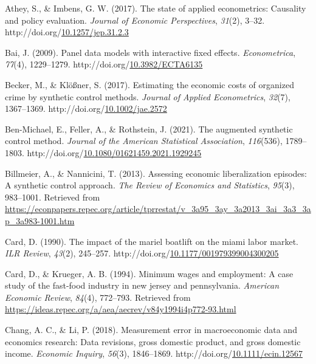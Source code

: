 \documentclass[12pt,nobind, a4paper]{reedthesis}
\newlength{\cslhangindent}
\newenvironment{CSLReferences}[2] %
{%
	\setlength{\parindent}{0pt}
	\ifodd #1 \everypar{\setlength{\hangindent}{\cslhangindent}}\ignorespaces\fi
	\ifnum #2 > 0
	\setlength{\parskip}{#2\baselineskip}
	\fi
}%
{}
\begin{document}
\begin{CSLReferences}{1}{0}
 \leavevmode{}%
 Athey, S., \& Imbens, G. W. (2017). The state of applied econometrics: Causality and policy evaluation. \emph{Journal of Economic Perspectives}, \emph{31}(2), 3--32. http://doi.org/\href{https://doi.org/10.1257/jep.31.2.3}{10.1257/jep.31.2.3}

 \leavevmode{}%
 Bai, J. (2009). Panel data models with interactive fixed effects. \emph{Econometrica}, \emph{77}(4), 1229--1279. http://doi.org/\href{https://doi.org/10.3982/ECTA6135}{10.3982/ECTA6135}

 \leavevmode{}%
 Becker, M., \& Klößner, S. (2017). Estimating the economic costs of organized crime by synthetic control methods. \emph{Journal of Applied Econometrics}, \emph{32}(7), 1367--1369. http://doi.org/\href{https://doi.org/10.1002/jae.2572}{10.1002/jae.2572}

 \leavevmode{}%
 Ben-Michael, E., Feller, A., \& Rothstein, J. (2021). The augmented synthetic control method. \emph{Journal of the American Statistical Association}, \emph{116}(536), 1789--1803. http://doi.org/\href{https://doi.org/10.1080/01621459.2021.1929245}{10.1080/01621459.2021.1929245}

 \leavevmode{}%
 Billmeier, A., \& Nannicini, T. (2013). Assessing economic liberalization episodes: A synthetic control approach. \emph{The Review of Economics and Statistics}, \emph{95}(3), 983--1001. Retrieved from \url{https://econpapers.repec.org/article/tprrestat/v_3a95_3ay_3a2013_3ai_3a3_3ap_3a983-1001.htm}

 \leavevmode{}%
 Card, D. (1990). The impact of the mariel boatlift on the miami labor market. \emph{{ILR} Review}, \emph{43}(2), 245--257. http://doi.org/\href{https://doi.org/10.1177/001979399004300205}{10.1177/001979399004300205}

 \leavevmode{}%
 Card, D., \& Krueger, A. B. (1994). Minimum wages and employment: A case study of the fast-food industry in new jersey and pennsylvania. \emph{American Economic Review}, \emph{84}(4), 772--793. Retrieved from \url{https://ideas.repec.org/a/aea/aecrev/v84y1994i4p772-93.html}

 \leavevmode{}%
 Chang, A. C., \& Li, P. (2018). Measurement error in macroeconomic data and economics research: Data revisions, gross domestic product, and gross domestic income. \emph{Economic Inquiry}, \emph{56}(3), 1846--1869. http://doi.org/\href{https://doi.org/10.1111/ecin.12567}{10.1111/ecin.12567}


\end{CSLReferences}
\end{document}
